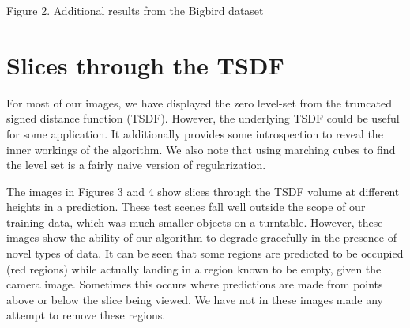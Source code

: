 \documentclass[10pt,onecolumn,letterpaper]{article}
\begin{document}
\centerline{\small Figure 2. Additional results from the Bigbird dataset}







\newpage

\section{Slices through the TSDF}

For most of our images, we have displayed the zero level-set from the truncated signed distance function (TSDF).
However, the underlying TSDF could be useful for some application.
It additionally provides some introspection to reveal the inner workings of the algorithm.
We also note that using marching cubes to find the level set is a fairly naive version of regularization.

The images in Figures 3 and 4 show slices through the TSDF volume at different heights in a prediction.
These test scenes fall well outside the scope of our training data, which was much smaller objects on a turntable.
However, these images show the ability of our algorithm to degrade gracefully in the presence of novel types of data.
It can be seen that some regions are predicted to be occupied (red regions) while actually landing in a region known to be empty, given the camera image. Sometimes this occurs where predictions are made from points above or below the slice being viewed.
We have not in these images made any attempt to remove these regions.

\newcommand{\imheight}{0.17\columnwidth}
\end{document}
